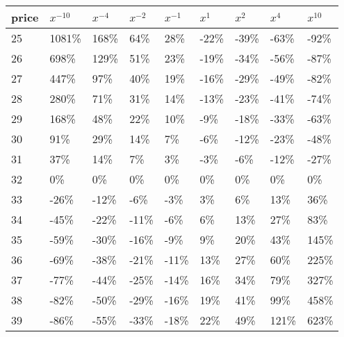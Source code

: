 \documentclass[12pt]{article}
\begin{document}
    \begin{center}
        \begin{tabular}{l||l|l|l|l|l|l|l|l}
            price & $x^{-10}$ & $x^{-4}$ & $x^{-2}$ & $x^{-1}$ & $x^1$ & $x^{2}$ & $x^{4}$ & $x^{10}$ \\ \hline \hline
            25    & 1081\%    & 168\%    & 64\%     & 28\%     & -22\% & -39\%   & -63\%   & -92\%    \\ \hline
            26    & 698\%     & 129\%    & 51\%     & 23\%     & -19\% & -34\%   & -56\%   & -87\%    \\ \hline
            27    & 447\%     & 97\%     & 40\%     & 19\%     & -16\% & -29\%   & -49\%   & -82\%    \\ \hline
            28    & 280\%     & 71\%     & 31\%     & 14\%     & -13\% & -23\%   & -41\%   & -74\%    \\ \hline
            29    & 168\%     & 48\%     & 22\%     & 10\%     & -9\%  & -18\%   & -33\%   & -63\%    \\ \hline
            30    & 91\%      & 29\%     & 14\%     & 7\%      & -6\%  & -12\%   & -23\%   & -48\%    \\ \hline
            31    & 37\%      & 14\%     & 7\%      & 3\%      & -3\%  & -6\%    & -12\%   & -27\%    \\ \hline
            32    & 0\%       & 0\%      & 0\%      & 0\%      & 0\%   & 0\%     & 0\%     & 0\%      \\ \hline
            33    & -26\%     & -12\%    & -6\%     & -3\%     & 3\%   & 6\%     & 13\%    & 36\%     \\ \hline
            34    & -45\%     & -22\%    & -11\%    & -6\%     & 6\%   & 13\%    & 27\%    & 83\%     \\ \hline
            35    & -59\%     & -30\%    & -16\%    & -9\%     & 9\%   & 20\%    & 43\%    & 145\%    \\ \hline
            36    & -69\%     & -38\%    & -21\%    & -11\%    & 13\%  & 27\%    & 60\%    & 225\%    \\ \hline
            37    & -77\%     & -44\%    & -25\%    & -14\%    & 16\%  & 34\%    & 79\%    & 327\%    \\ \hline
            38    & -82\%     & -50\%    & -29\%    & -16\%    & 19\%  & 41\%    & 99\%    & 458\%    \\ \hline
            39    & -86\%     & -55\%    & -33\%    & -18\%    & 22\%  & 49\%    & 121\%   & 623\%
        \end{tabular}
    \end{center}
\end{document}
